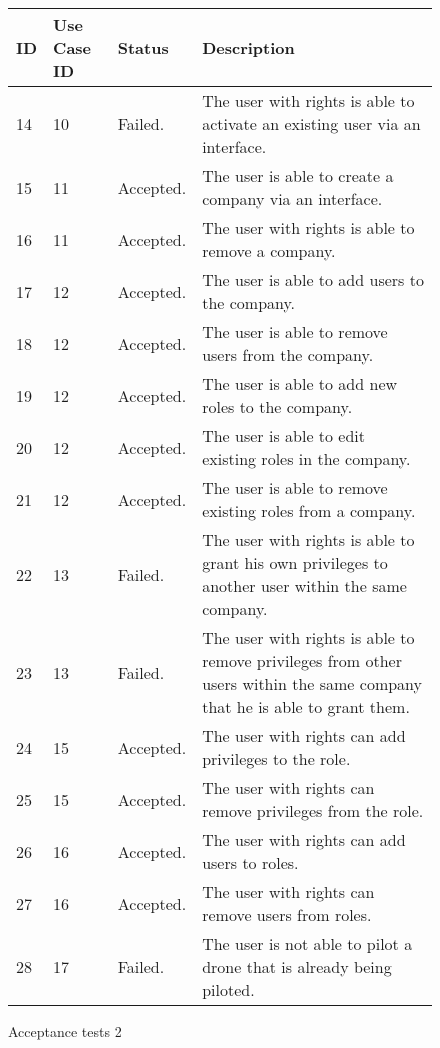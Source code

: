 \begin{figure}[htb]
\begin{center}
\begin{tabular}{ | l | l | l | p{8cm} | }
  \hline
	\textbf{ID} & \textbf{Use Case ID} & \textbf{Status} & \textbf{Description} \\ \hline
	14 & 10 & Failed. & The user with rights is able to activate an existing user via an interface.  \\ \hline
	15 & 11 & Accepted. & The user is able to create a company via an interface.  \\ \hline
	16 & 11 & Accepted. & The user with rights is able to remove a company. \\ \hline
	17 & 12 & Accepted. & The user is able to add users to the company.   \\ \hline
	18 & 12 & Accepted. & The user is able to remove users from the company.  \\ \hline
	19 & 12 & Accepted. & The user is able to add new roles to the company.  \\ \hline
	20 & 12 & Accepted. & The user is able to edit existing roles in the company.  \\ \hline
	21 & 12 & Accepted. & The user is able to remove existing roles from a company.  \\ \hline
	22 & 13 & Failed. & The user with rights is able to grant his own privileges to another user within the same company.  \\ \hline
	23 & 13 & Failed. & The user with rights is able to remove privileges from other users within the same company that he is able to grant them.  \\ \hline
	24 & 15 & Accepted. & The user with rights can add privileges to the role.  \\ \hline
	25 & 15 & Accepted. & The user with rights can remove privileges from the role.  \\ \hline
	26 & 16 & Accepted. & The user with rights can add users to roles.  \\ \hline
	27 & 16 & Accepted. & The user with rights can remove users from roles.  \\ \hline
	28 & 17 & Failed. & The user is not able to pilot a drone that is already being piloted. \\
  \hline
\end{tabular}
\caption{Acceptance tests 2}
\label{tab:acceptance_tests2}
\end{center}
\end{figure}


